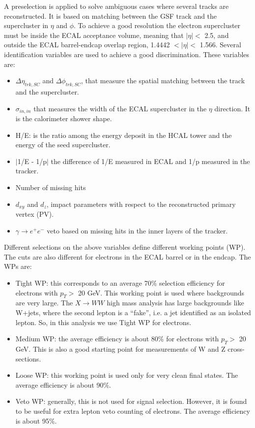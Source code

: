 A preselection is applied to solve ambiguous cases where several tracks are reconstructed. It is based on matching
between the GSF track and the supercluster in $\eta$ and $\phi$. To achieve a good resolution the electron supercluster must
be inside the ECAL acceptance volume, meaning that  $|\eta|<$ 2.5, and outside the ECAL barrel-endcap
overlap region, 1.4442 $<|\eta|<$ 1.566.
Several identification variables are used to achieve a good discrimination. These variables are:
\begin{itemize}
\item $\Delta \eta_{trk,SC}$ and $\Delta \phi_{trk,SC}$, that measure the spatial matching between the track
and the supercluster.
\item $\sigma_{in,in}$ that measures the width of the ECAL supercluster in the $\eta$ direction. It is the calorimeter shower shape.
\item H/E: is the ratio among the energy deposit in the HCAL tower and the energy of the seed supercluster.
\item $|$1/E - 1/p$|$ the difference of 1/E measured in ECAL and 1/p measured in the tracker.
\item Number of missing hits
\item $d_{xy}$ and $d_z$, impact parameters with respect to the reconstructed primary vertex (PV).
\item $\gamma \to e^+ e^-$ veto based on missing hits in the inner layers of the tracker.
\end{itemize}
Different selections on the above variables define different working points (WP). The cuts are also different for electrons in
the ECAL barrel or in the endcap. The WPs are:
\begin{itemize}
\item Tight WP: this corresponds to an average 70\% selection efficiency for electrons with
$p_T >$ 20 GeV. This working point is used where backgrounds are very large. The
$X \to WW$ high mass analysis has large backgrounds like W+jets, where the second lepton is a ``fake'', i.e. a jet identified as an isolated lepton. 
So, in this analysis we use Tight WP for electrons. %
\item Medium WP: the average efficiency is about 80\% for electrons with $p_T>$ 20
GeV. This is also a good starting point for measurements of W and Z cross-sections.
\item Loose WP: this working point is used only for very clean final states. The average efficiency is about 90\%.
\item Veto WP: generally, this is not used for signal selection. However, it is found to
be useful for extra lepton veto counting of electrons. The average efficiency is about 95\%.
\end{itemize}
